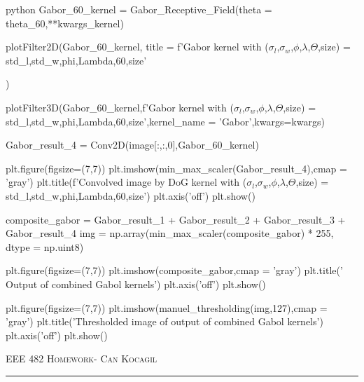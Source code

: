 \documentclass[12pt]{amsart}
\begin{document}
\begin{mintedbox}{python}
Gabor_60_kernel = Gabor_Receptive_Field(theta = theta_60,**kwargs_kernel)

plotFilter2D(Gabor_60_kernel,
title = f'Gabor kernel with  ($\sigma_l$,$\sigma_w$,$\phi$,$\lambda$,$\Theta$,size) = {std_l,std_w,phi,Lambda,60,size}'

)

plotFilter3D(Gabor_60_kernel,f'Gabor kernel with ($\sigma_l$,$\sigma_w$,$\phi$,$\lambda$,$\Theta$,size) = {std_l,std_w,phi,Lambda,60,size}',kernel_name = 'Gabor',kwargs=kwargs)



Gabor_result_4 = Conv2D(image[:,:,0],Gabor_60_kernel)


plt.figure(figsize=(7,7))
plt.imshow(min_max_scaler(Gabor_result_4),cmap = 'gray')
plt.title(f'Convolved image by DoG kernel with   ($\sigma_l$,$\sigma_w$,$\phi$,$\lambda$,$\Theta$,size) = {std_l,std_w,phi,Lambda,60,size}')
plt.axis('off')
plt.show()

composite_gabor = Gabor_result_1 + Gabor_result_2 + Gabor_result_3 + Gabor_result_4
img = np.array(min_max_scaler(composite_gabor) * 255, dtype = np.uint8)



plt.figure(figsize=(7,7))
plt.imshow(composite_gabor,cmap = 'gray')
plt.title(' Output of combined Gabol kernels')
plt.axis('off')
plt.show()

plt.figure(figsize=(7,7))
plt.imshow(manuel_thresholding(img,127),cmap = 'gray')
plt.title('Thresholded image of output of combined Gabol kernels')
plt.axis('off')
plt.show()

\end{mintedbox}



\newpage
{\scshape EEE 482} \hfill {\scshape \large  Homework-\relax} \hfill {\scshape Can Kocagil}
\smallskip
\hrule
\vspace{2mm}

\printbibliography
\end{document}
